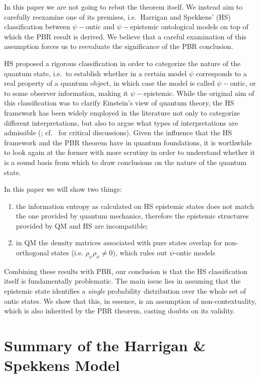 \documentclass[twocolumn,prl,floatfix,superscriptaddress]{revtex4-2}
\begin{document}
In this paper we are not going to rebut the theorem itself. We instead aim to carefully reexamine one of its premises, i.e.\ Harrigan and Spekkens' (HS) classification between $\psi-$ontic and $\psi-$epistemic ontological models  \cite{Harrigan:2010} on top of which the PBR result is derived. We believe that a careful examination of this assumption forces us to reevaluate the significance of the PBR conclusion. 
		
HS proposed a rigorous classification in order to categorize the nature of the quantum state, i.e.\ to establish whether in a certain model $\psi$ corresponds to a real property of a quantum object, in which case the model is called $\psi-$ontic, or to some observer information, making it $\psi-$epistemic. While the original aim of this classification was to clarify Einstein's view of quantum theory, the HS framework has been widely employed in the literature not only to categorize different interpretations, but also to argue what types of interpretations are admissible (\cite{Leifer:2013, Leifer:2017, Branciard:2014, Hermens:2021, Wood:2015, Ringbauer:2015, Mazurek:2016, Bartlett:2012}; cf.\ \cite{Oldofredi:2020b, Lewis:2012, Ladyman:2021} for critical discussions). Given the influence that the HS framework and the PBR theorem have in quantum foundations, it is worthwhile to look again at the former with more scrutiny in order to understand whether it is a sound basis from which to draw conclusions on the nature of the quantum state.

In this paper we will show two things:
\begin{enumerate}
	\item the information entropy as calculated on HS epistemic states does not match the one provided by quantum mechanics, therefore the epistemic structures provided by QM and HS are incompatible;
	\item in QM the density matrices associated with pure states overlap for non-orthogonal states (i.e. $\rho_\psi \rho_\phi \neq 0$), which rules out $\psi$-ontic models
\end{enumerate}
Combining these results with PBR, our conclusion is that the HS classification itself is fundamentally problematic. The main issue lies in assuming that the epistemic state identifies a \emph{single} probability distribution over the whole set of ontic states. We show that this, in essence, is an assumption of non-contextuality, which is also inherited by the PBR theorem, casting doubts on its validity.

\section{Summary of the Harrigan \& Spekkens Model}
\end{document}
